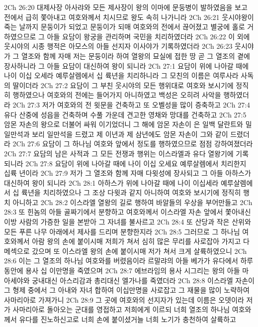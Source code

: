 2Ch 26:20  대제사장 아사랴와 모든 제사장이 왕의 이마에 문둥병이 발하였음을 보고 전에서 급히 쫓아내고 여호와께서 치시므로 왕도 속히 나가니라
2Ch 26:21  웃시야왕이 죽는 날까지 문둥이가 되었고 문둥이가 되매 여호와의 전에서 끊어졌고 별궁에 홀로 거하였으므로 그 아들 요담이 왕궁을 관리하며 국민을 치리하였더라
2Ch 26:22  이 외에 웃시야의 시종 행적은 아모스의 아들 선지자 이사야가 기록하였더라
2Ch 26:23  웃시야가 그 열조와 함께 자매 저는 문둥이라 하여 열왕의 묘실에 접한 땅 곧 그 열조의 곁에 장사하니라 그 아들 요담이 대신하여 왕이 되니라
2Ch 27:1  요담이 위에 나아갈 때에 나이 이십 오세라 예루살렘에서 십 륙년을 치리하니라 그 모친의 이름은 여루사라 사독의 딸이더라
2Ch 27:2  요담이 그 부친 웃시야의 모든 행위대로 여호와 보시기에 정직히 행하였으나 여호와의 전에는 들어가지 아니하였고 백성은 오히려 사악을 행하였더라
2Ch 27:3  저가 여호와의 전 윗문을 건축하고 또 오벨성을 많이 증축하고
2Ch 27:4  유다 산중에 성읍을 건축하며 수풀 가운데 견고한 영채와 망대를 건축하고
2Ch 27:5  암몬 자손의 왕으로 더불어 싸워 이기었더니 그 해에 암몬 자손이 은 일백 달란트와 밀 일만석과 보리 일만석을 드렸고 제 이년과 제 삼년에도 암몬 자손이 그와 같이 드렸더라
2Ch 27:6  요담이 그 하나님 여호와 앞에서 정도를 행하였으므로 점점 강하여졌더라
2Ch 27:7  요담의 남은 사적과 그 모든 전쟁과 행위는 이스라엘과 유다 열왕기에 기록되니라
2Ch 27:8  요담이 위에 나아갈 때에 나이 이십 오세요 예루살렘에서 치리한지 십륙 년이라
2Ch 27:9  저가 그 열조와 함께 자매 다윗성에 장사되고 그 아들 아하스가 대신하여 왕이 되니라
2Ch 28:1  아하스가 위에 나아갈 때에 나이 이십세라 예루살렘에서 십 륙년을 치리하였으나 그 조상 다윗과 같지 아니하여 여호와 보시기에 정직히 행치 아니하고
2Ch 28:2  이스라엘 열왕의 길로 행하여 바알들의 우상을 부어만들고
2Ch 28:3  또 힌놈의 아들 골짜기에서 분향하고 여호와께서 이스라엘 자손 앞에서 쫓아내신 이방 사람의 가증한 일을 본받아 그 자녀를 불사르고
2Ch 28:4  또 산당과 작은 산위와 모든 푸른 나무 아래에서 제사를 드리며 분향한지라
2Ch 28:5  그러므로 그 하나님 여호와께서 아람 왕의 손에 붙이시매 저희가 쳐서 심히 많은 무리를 사로잡아 가지고 다메섹으로 갔으며 또 이스라엘 왕의 손에 붙이시매 저가 쳐서 크게 살륙하였으니
2Ch 28:6  이는 그 열조의 하나님 여호와를 버렸음이라 르말랴의 아들 베가가 유다에서 하루 동안에 용사 십 이만명을 죽였으며
2Ch 28:7  에브라임의 용사 시그리는 왕의 아들 마아세야와 궁내대신 아스리감과 총리대신 엘가나를 죽였더라
2Ch 28:8  이스라엘 자손이 그 형제 중에서 그 아내와 자녀 합하여 이십만명을 사로잡고 그 재물을 많이 노략하여 사마리아로 가져가니
2Ch 28:9  그 곳에 여호와의 선지자가 있는데 이름은 오뎃이라 저가 사마리아로 돌아오는 군대를 영접하고 저희에게 이르되 너희 열조의 하나님 여호와께서 유다를 진노하신고로 너희 손에 붙이셨거늘 너희 노기가 충천하여 살륙하고
